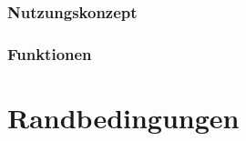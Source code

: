 \documentclass[a4paper,12pt,
headsepline,           %
oneside,               %
pointlessnumbers,      %
bibtotoc,              %
]{scrartcl}
\begin{document}
    \section{Nutzungskonzept}
    
    
    
    
    
    
    
    
    \section{Funktionen}

    \part{Randbedingungen}
\end{document}
